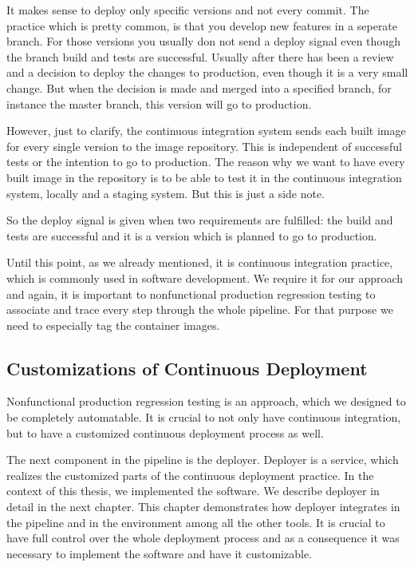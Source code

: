 It makes sense to deploy only specific versions and not every commit. The practice which
is pretty common, is that you develop new features in a seperate branch. For those
versions you usually don not send a deploy signal even though the branch build and tests
are successful. Usually after there has been a review and a decision to deploy the changes
to production, even though it is a very small change. But when the decision is made and
merged into a specified branch, for instance the master branch, this version will go to
production.

However, just to clarify, the continuous integration system sends each built image for
every single version to the image repository. This is independent of successful tests or
the intention to go to production. The reason why we want to have every built image in the
repository is to be able to test it in the continuous integration system, locally and a
staging system. But this is just a side note.

So the deploy signal is given when two requirements are fulfilled: the build and tests are
successful and it is a version which is planned to go to production.

Until this point, as we already mentioned, it is continuous integration practice, which is
commonly used in software development. We require it for our approach and again, it is
important to nonfunctional production regression testing to associate and trace every step
through the whole pipeline. For that purpose we need to especially tag the container
images.

\subsection{Customizations of Continuous Deployment}

Nonfunctional production regression testing is an approach, which we designed to be
completely automatable. It is crucial to not only have continuous integration, but to have
a customized continuous deployment process as well.

The next component in the pipeline is the deployer. Deployer is a service, which realizes
the customized parts of the continuous deployment practice. In the context of this thesis,
we implemented the software. We describe deployer in detail in the next chapter. This
chapter demonstrates how deployer integrates in the pipeline and in the environment among
all the other tools. It is crucial to have full control over the whole deployment process
and as a consequence it was necessary to implement the software and have it customizable.

